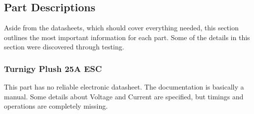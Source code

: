 \documentclass[titlepage]{article}
\begin{document}
\subsection{Part Descriptions}

Aside from the datasheets, which should cover everything needed, this section
outlines the most important information for each part. Some of the details in
this section were discovered through testing.

\subsubsection{Turnigy Plush 25A ESC}

This part has no reliable electronic datasheet. The documentation is basically
a manual. Some details about Voltage and Current are specified, but timings
and operations are completely missing.

\end{document}
